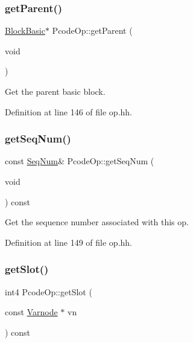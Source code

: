 \subsubsection{\texorpdfstring{getParent()}{getParent()}\hspace{0.1cm}{\footnotesize\ttfamily [2/2]}}
{\footnotesize\ttfamily \mbox{\hyperlink{class_block_basic}{Block\+Basic}}$\ast$ Pcode\+Op\+::get\+Parent (\begin{DoxyParamCaption}\item[{void}]{ }\end{DoxyParamCaption})\hspace{0.3cm}{\ttfamily [inline]}}



Get the parent basic block. 



Definition at line 146 of file op.\+hh.

\mbox{\label{class_pcode_op_a050ebe7063f5e79c2c8a97cd0df9c61a}} 
\subsubsection{\texorpdfstring{getSeqNum()}{getSeqNum()}}
{\footnotesize\ttfamily const \mbox{\hyperlink{class_seq_num}{Seq\+Num}}\& Pcode\+Op\+::get\+Seq\+Num (\begin{DoxyParamCaption}\item[{void}]{ }\end{DoxyParamCaption}) const\hspace{0.3cm}{\ttfamily [inline]}}



Get the sequence number associated with this op. 



Definition at line 149 of file op.\+hh.

\mbox{\label{class_pcode_op_a3bf80a4ef518e6a41cc0f0e8ae08e7b4}} 
\subsubsection{\texorpdfstring{getSlot()}{getSlot()}}
{\footnotesize\ttfamily int4 Pcode\+Op\+::get\+Slot (\begin{DoxyParamCaption}\item[{const \mbox{\hyperlink{class_varnode}{Varnode}} $\ast$}]{vn }\end{DoxyParamCaption}) const\hspace{0.3cm}{\ttfamily [inline]}}



